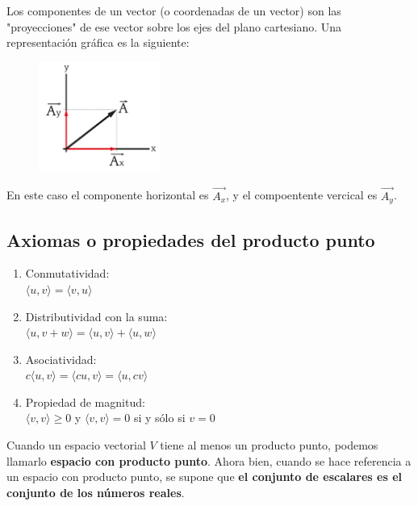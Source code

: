 \documentclass{article}
\begin{document}
    Los componentes de un vector (o coordenadas de un vector) son las "proyecciones" de ese vector sobre los ejes del plano cartesiano. Una representación gráfica es la siguiente:

    \begin{figure}[h]
        \centering
        \includegraphics[width=4cm]{img-1-componentes.png}
    \end{figure}

    En este caso el componente horizontal es $\vec{A_x}$, y el compoentente vercical es $\vec{A_y}$.

    \subsection{Axiomas o propiedades del producto punto}

    \begin{enumerate}

        \item Conmutatividad: \\
            $\langle u, v\rangle = \langle v, u\rangle$
        \item Distributividad con la suma: \\
            $\langle u, v + w\rangle = \langle u, v\rangle + \langle u, w\rangle$
        \item Asociatividad: \\
            $c\langle u, v\rangle=\langle c u, v\rangle=\langle u, c v\rangle$
        \item Propiedad de magnitud: \\
            $\langle v, v\rangle \geq 0$ y $\langle v, v\rangle = 0$ si y sólo si $v = 0$

    \end{enumerate}

    Cuando un espacio vectorial $V$ tiene al menos un producto punto, podemos llamarlo \textbf{espacio con producto punto}. Ahora bien, cuando se hace referencia a un espacio con producto punto, se supone que \textbf{el conjunto de escalares es el conjunto de los números reales}.

\end{document}
